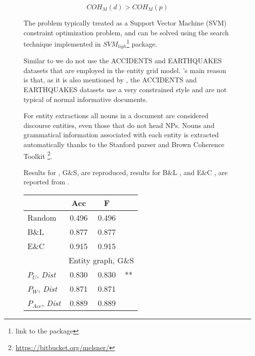 \begin{figure}[!t]
\begin{equation}
COH_M(d) > COH_M(p)
\end{equation}

The problem typically treated as a Support Vector Machine (SVM) constraint optimization problem, and can be solved using the search technique implemented in $SVM_{ligh}$\footnote{link to the package} \cite{joachims02} package. 

Similar to  we do not use the ACCIDENTS and EARTHQUAKES datasets that are employed in the entity grid model. 
's main reason is that, as  it is also mentioned by , the ACCIDENTS and EARTHQUAKES datasets use a very constrained style and are not typical of normal informative documents. 


For entity extractions all nouns in a document are considered discourse entities, even those that do not head NPs.
Nouns and grammatical information associated with each entity is extracted automatically thanks to the Stanford parser \cite{marneffe06} and Brown Coherence Toolkit \footnote{\url{https://bitbucket.org/melsner/}}. 



Results for , G\&S, are reproduced, results for 
B\&L , and E\&C ,  are reported from . 


\begin{table}[!t]
\centering
\begin{small}
\begin{tabular}{l|cc@{}l}
& Acc & F &\\\hline
Random & 0.496 & 0.496 & \\
B\&L & 0.877 & 0.877 &\\ 
E\&C & 0.915 & 0.915  &\\\hline

& \multicolumn{3}{|c}{Entity graph, G\&S} \\\hline 
$P_U$, \textit{Dist} & 0.830 & 0.830 & ** \\
$P_W$, \textit{Dist} & 0.871 & 0.871& \\
$P_{Acc}$, \textit{Dist} & 0.889 & 0.889& \\\hline


\end{tabular}
\end{small}
\end{table}
\end{figure}
